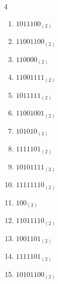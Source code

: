 \begin{multicols}{4}
\begin{enumerate}
        \phantom{$=239$}

  \item $1011100_{(2)}$

        \phantom{$=92$}

\columnbreak %

  \item $11001100_{(2)}$

        \phantom{$=204$}

  \item $110000_{(2)}$

        \phantom{$=48$}

  \item $11001111_{(2)}$

        \phantom{$=207$}

  \item $1011111_{(2)}$

        \phantom{$=95$}

  \item $11001001_{(2)}$

        \phantom{$=201$}

  \item $101010_{(2)}$

        \phantom{$=42$}

  \item $1111101_{(2)}$

        \phantom{$=125$}

  \item $10101111_{(2)}$

        \phantom{$=175$}

  \item $11111110_{(2)}$

        \phantom{$=254$}

  \item $100_{(2)}$

        \phantom{$=4$}

  \item $11011110_{(2)}$

        \phantom{$=222$}

  \item $1001101_{(2)}$

        \phantom{$=77$}

  \item $1111101_{(2)}$

        \phantom{$=125$}

  \item $10101100_{(2)}$


\end{enumerate}
\end{multicols}
